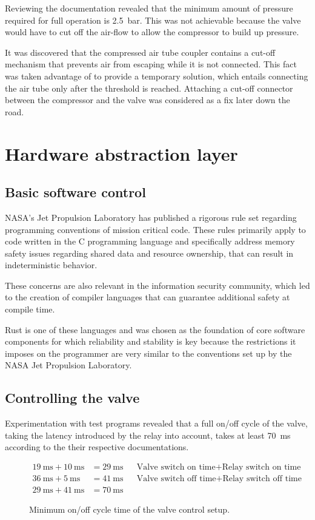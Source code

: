 Reviewing the documentation revealed that the minimum amount of pressure required for full operation is \SI{2,5}{\bar}. This was not achievable because the valve would have to cut off the air-flow to allow the compressor to build up pressure.

It was discovered that the compressed air tube coupler contains a cut-off mechanism that prevents air from escaping while it is not connected. This fact was taken advantage of to provide a temporary solution, which entails connecting the air tube only after the threshold is reached. Attaching a cut-off connector between the compressor and the valve was considered as a fix later down the road.

\section{Hardware abstraction layer}
\author{Philip Trauner}

\subsection{Basic software control}
NASA's Jet Propulsion Laboratory \cite{jpl} has published a rigorous rule set \cite{jpl-rules} regarding programming conventions of mission critical code. These rules primarily apply to code written in the C programming language and specifically address memory safety issues regarding shared data and resource ownership, that can result in indeterministic behavior. 

These concerns are also relevant in the information security community, which led to the creation of compiler languages that can guarantee additional safety at compile time. 

Rust \cite{rust} is one of these languages and was chosen as the foundation of core software components for which reliability and stability is key because the restrictions it imposes on the programmer are very similar to the conventions set up by the NASA Jet Propulsion Laboratory.

\subsection{Controlling the valve}
Experimentation with test programs revealed that a full on/off cycle of the valve, taking the latency introduced by the relay into account, takes at least \SI{70}{\milli\second} according to the their respective documentations. 
\begin{figure}[h]
\begin{align*}
    \SI{19}{\milli\second} + \SI{10}{\milli\second} &=\SI{29}{\milli\second} && \text{Valve switch on time} + \text{Relay switch on time} \\
    \SI{36}{\milli\second} + \SI{5}{\milli\second}  &=\SI{41}{\milli\second} && \text{Valve switch off time} + \text{Relay switch off time}\\
    \SI{29}{\milli\second} + \SI{41}{\milli\second} &=\SI{70}{\milli\second} 
\end{align*}
\caption{Minimum on/off cycle time of the valve control setup.}
\end{figure}

